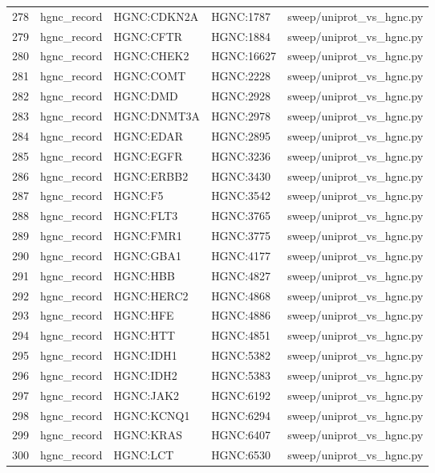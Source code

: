 {\begin{longtable}{rllp{3.2cm}p{4.2cm}}
278 & hgnc\_record & HGNC:CDKN2A & HGNC:1787 & sweep/uniprot\_vs\_hgnc.py\\
279 & hgnc\_record & HGNC:CFTR & HGNC:1884 & sweep/uniprot\_vs\_hgnc.py\\
280 & hgnc\_record & HGNC:CHEK2 & HGNC:16627 & sweep/uniprot\_vs\_hgnc.py\\
281 & hgnc\_record & HGNC:COMT & HGNC:2228 & sweep/uniprot\_vs\_hgnc.py\\
282 & hgnc\_record & HGNC:DMD & HGNC:2928 & sweep/uniprot\_vs\_hgnc.py\\
283 & hgnc\_record & HGNC:DNMT3A & HGNC:2978 & sweep/uniprot\_vs\_hgnc.py\\
284 & hgnc\_record & HGNC:EDAR & HGNC:2895 & sweep/uniprot\_vs\_hgnc.py\\
285 & hgnc\_record & HGNC:EGFR & HGNC:3236 & sweep/uniprot\_vs\_hgnc.py\\
286 & hgnc\_record & HGNC:ERBB2 & HGNC:3430 & sweep/uniprot\_vs\_hgnc.py\\
287 & hgnc\_record & HGNC:F5 & HGNC:3542 & sweep/uniprot\_vs\_hgnc.py\\
288 & hgnc\_record & HGNC:FLT3 & HGNC:3765 & sweep/uniprot\_vs\_hgnc.py\\
289 & hgnc\_record & HGNC:FMR1 & HGNC:3775 & sweep/uniprot\_vs\_hgnc.py\\
290 & hgnc\_record & HGNC:GBA1 & HGNC:4177 & sweep/uniprot\_vs\_hgnc.py\\
291 & hgnc\_record & HGNC:HBB & HGNC:4827 & sweep/uniprot\_vs\_hgnc.py\\
292 & hgnc\_record & HGNC:HERC2 & HGNC:4868 & sweep/uniprot\_vs\_hgnc.py\\
293 & hgnc\_record & HGNC:HFE & HGNC:4886 & sweep/uniprot\_vs\_hgnc.py\\
294 & hgnc\_record & HGNC:HTT & HGNC:4851 & sweep/uniprot\_vs\_hgnc.py\\
295 & hgnc\_record & HGNC:IDH1 & HGNC:5382 & sweep/uniprot\_vs\_hgnc.py\\
296 & hgnc\_record & HGNC:IDH2 & HGNC:5383 & sweep/uniprot\_vs\_hgnc.py\\
297 & hgnc\_record & HGNC:JAK2 & HGNC:6192 & sweep/uniprot\_vs\_hgnc.py\\
298 & hgnc\_record & HGNC:KCNQ1 & HGNC:6294 & sweep/uniprot\_vs\_hgnc.py\\
299 & hgnc\_record & HGNC:KRAS & HGNC:6407 & sweep/uniprot\_vs\_hgnc.py\\
300 & hgnc\_record & HGNC:LCT & HGNC:6530 & sweep/uniprot\_vs\_hgnc.py\\

\end{longtable}}
